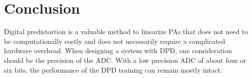 \documentclass[conference]{IEEEtran}
\begin{document}
%






\section{Conclusion}
Digital predistortion is a valuable method to linearize PAs that does not need to be computationally costly and does not necessarily require a complicated hardware overhead. 
When designing a system with DPD, one consideration should be the precision of the ADC. 
With a low precision ADC of about four or six bits, the performance of the DPD training can remain mostly intact.
\end{document}
